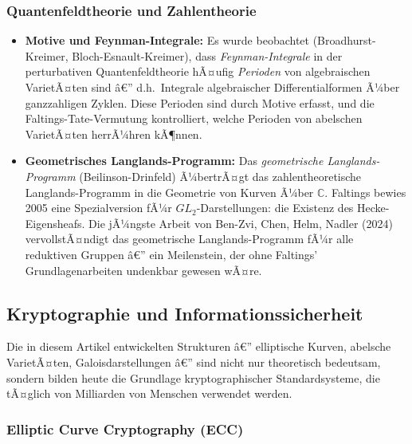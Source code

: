 ﻿\documentclass[12pt,a4paper]{article}
\theoremstyle{plain}
\theoremstyle{definition}
\theoremstyle{remark}
\newcommand{\C}{\mathbb{C}}
\begin{document}
\subsubsection{Quantenfeldtheorie und Zahlentheorie}

\begin{itemize}[leftmargin=2em,itemsep=4pt]
  \item \textbf{Motive und Feynman-Integrale:}
    Es wurde beobachtet (Broadhurst-Kreimer, Bloch-Esnault-Kreimer), dass
    \emph{Feynman-Integrale} in der perturbativen Quantenfeldtheorie hÃ¤ufig
    \emph{Perioden} von algebraischen VarietÃ¤ten sind â€” d.h.\ Integrale
    algebraischer Differentialformen Ã¼ber ganzzahligen Zyklen.
    Diese Perioden sind durch Motive erfasst, und die Faltings-Tate-Vermutung
    kontrolliert, welche Perioden von abelschen VarietÃ¤ten herrÃ¼hren kÃ¶nnen.

  \item \textbf{Geometrisches Langlands-Programm:}
    Das \emph{geometrische Langlands-Programm} (Beilinson-Drinfeld) Ã¼bertrÃ¤gt das
    zahlentheoretische Langlands-Programm in die Geometrie von Kurven Ã¼ber $\C$.
    Faltings bewies 2005 eine Spezialversion fÃ¼r $GL_2$-Darstellungen:
    die Existenz des Hecke-Eigensheafs.
    Die jÃ¼ngste Arbeit von Ben-Zvi, Chen, Helm, Nadler (2024) vervollstÃ¤ndigt
    das geometrische Langlands-Programm fÃ¼r alle reduktiven Gruppen â€”
    ein Meilenstein, der ohne Faltings' Grundlagenarbeiten undenkbar gewesen wÃ¤re.
\end{itemize}

\subsection{Kryptographie und Informationssicherheit}

Die in diesem Artikel entwickelten Strukturen â€” elliptische Kurven, abelsche VarietÃ¤ten,
Galoisdarstellungen â€” sind nicht nur theoretisch bedeutsam, sondern bilden heute
die Grundlage kryptographischer Standardsysteme, die tÃ¤glich von Milliarden von
Menschen verwendet werden.

\subsubsection{Elliptic Curve Cryptography (ECC)}
\end{document}
